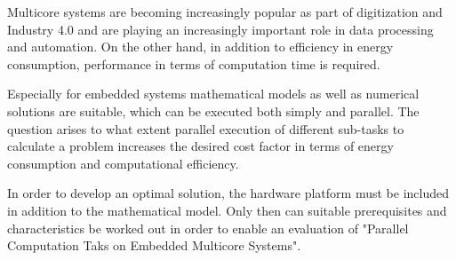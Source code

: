 Multicore systems are becoming increasingly popular as part of digitization and Industry 4.0 and are playing an increasingly important role in data processing and automation. On the other hand, in addition to efficiency in energy consumption, performance in terms of computation time is required.

Especially for embedded systems mathematical models as well as numerical solutions are suitable, which can be executed both simply and parallel. The question arises to what extent parallel execution of different sub-tasks to calculate a problem increases the desired cost factor in terms of energy consumption and computational efficiency.

In order to develop an optimal solution, the hardware platform must be included in addition to the mathematical model. Only then can suitable prerequisites and characteristics be worked out in order to enable an evaluation of "Parallel Computation Taks on Embedded Multicore Systems".